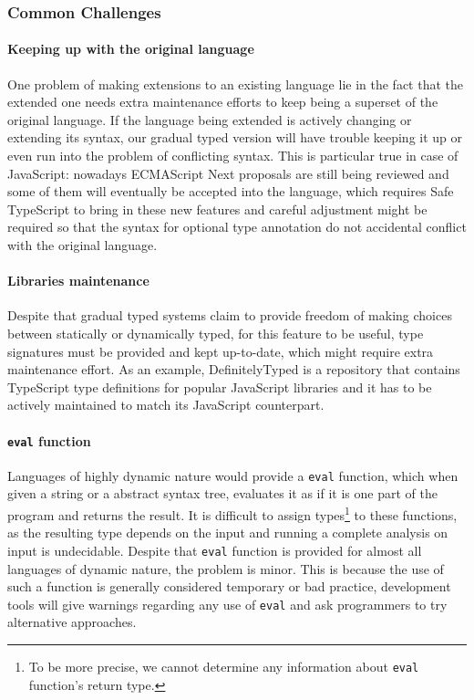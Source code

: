 \subsubsection{Common Challenges}

\paragraph{Keeping up with the original language}
One problem of making extensions to an existing language
lie in the fact that the extended one needs extra maintenance efforts to keep being
a superset of the original language.
If the language being extended is actively changing or extending its syntax,
our gradual typed version will have trouble keeping it up or
even run into the problem of conflicting syntax.
This is particular true in case of JavaScript: nowadays ECMAScript Next
proposals are still being reviewed and some of them will eventually 
be accepted into the language,
which requires Safe TypeScript to bring in these new features
and careful adjustment might be required so that the syntax for
optional type annotation do not accidental conflict with the original language.

\paragraph{Libraries maintenance}
Despite that gradual typed systems claim to provide freedom of making choices
between statically or dynamically typed,
for this feature to be useful, type signatures must be provided
and kept up-to-date, which might require extra maintenance effort.
As an example, DefinitelyTyped\cite{yankov2014definitelytyped}
is a repository that contains TypeScript type definitions for popular
JavaScript libraries and it has to be actively maintained to
match its JavaScript counterpart.

\paragraph{\texttt{eval} function}

Languages of highly dynamic nature would provide a \texttt{eval} function,
which when given a string or a abstract syntax tree, evaluates it as
if it is one part of the program and returns the result.
It is difficult to assign types\footnote{To be more precise,
we cannot determine any information about \texttt{eval} function's return type.
} to these functions, as
the resulting type depends on the input and running
a complete analysis on input is undecidable.
Despite that \texttt{eval} function is provided
for almost all languages of dynamic nature, the problem is minor.
This is because the use of such a function is generally considered
temporary or bad practice, development tools will give warnings
regarding any use of \texttt{eval} and ask programmers to try alternative approaches. 

